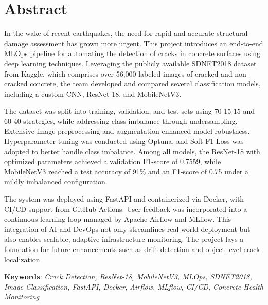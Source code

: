 
\chapter*{Abstract}

%


In the wake of recent earthquakes, the need for rapid and accurate structural damage assessment has grown more urgent. This project introduces an end-to-end MLOps pipeline for automating the detection of cracks in concrete surfaces using deep learning techniques. Leveraging the publicly available SDNET2018 dataset from Kaggle, which comprises over 56,000 labeled images of cracked and non-cracked concrete, the team developed and compared several classification models, including a custom CNN, ResNet-18, and MobileNetV3.

The dataset was split into training, validation, and test sets using 70-15-15 and 60-40 strategies, while addressing class imbalance through undersampling. Extensive image preprocessing and augmentation enhanced model robustness. Hyperparameter tuning was conducted using Optuna, and Soft F1 Loss was adopted to better handle class imbalance. Among all models, the ResNet-18 with optimized parameters achieved a validation F1-score of 0.7559, while MobileNetV3 reached a test accuracy of 91\% and an F1-score of 0.75 under a mildly imbalanced configuration.

The system was deployed using FastAPI and containerized via Docker, with CI/CD support from GitHub Actions. User feedback was incorporated into a continuous learning loop managed by Apache Airflow and MLflow. This integration of AI and DevOps not only streamlines real-world deployment but also enables scalable, adaptive infrastructure monitoring. The project lays a foundation for future enhancements such as drift detection and object-level crack localization.

\textbf{Keywords}: \textit{Crack Detection, ResNet-18, MobileNetV3, MLOps, SDNET2018, Image Classification, FastAPI, Docker, Airflow, MLflow, CI/CD, Concrete Health Monitoring}

\clearpage
